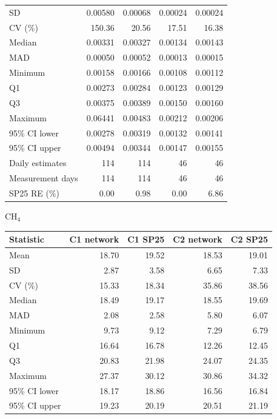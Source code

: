\begin{table}
\begin{minipage}[t]{0.48\textwidth}
\begin{tabular}{lrrrr}
SD & 0.00580 & 0.00068 & 0.00024 & 0.00024
\\
CV (\%) & 150.36 & 20.56 & 17.51 & 16.38
\\
Median & 0.00331 & 0.00327 & 0.00134 & 0.00143
\\
MAD & 0.00050 & 0.00052 & 0.00013 & 0.00015
\\
Minimum & 0.00158 & 0.00166 & 0.00108 & 0.00112
\\
Q1 & 0.00273 & 0.00284 & 0.00123 & 0.00129
\\
Q3 & 0.00375 & 0.00389 & 0.00150 & 0.00160
\\
Maximum & 0.06441 & 0.00483 & 0.00212 & 0.00206
\\
95\% CI lower & 0.00278 & 0.00319 & 0.00132 & 0.00141
\\
95\% CI upper & 0.00494 & 0.00344 & 0.00147 & 0.00155
\\
Daily estimates & 114 & 114 & 46 & 46
\\
Measurement days & 114 & 114 & 46 & 46
\\
SP25 RE (\%) & 0.00 & 0.98 & 0.00 & 6.86
\\
\bottomrule
\end{tabular}
\end{minipage}
\par\vspace{2mm}
\begin{minipage}[t]{0.48\textwidth}\centering\textbf{$\mathrm{CH_4}$}\par\vspace{1mm}
\begin{tabular}{lrrrr}
\toprule
Statistic & C1 network & C1 SP25 & C2 network & C2 SP25\\
\midrule
Mean & 18.70 & 19.52 & 18.53 & 19.01
\\
SD & 2.87 & 3.58 & 6.65 & 7.33
\\
CV (\%) & 15.33 & 18.34 & 35.86 & 38.56
\\
Median & 18.49 & 19.17 & 18.55 & 19.69
\\
MAD & 2.08 & 2.58 & 5.80 & 6.07
\\
Minimum & 9.73 & 9.12 & 7.29 & 6.79
\\
Q1 & 16.64 & 16.78 & 12.26 & 12.45
\\
Q3 & 20.83 & 21.98 & 24.07 & 24.35
\\
Maximum & 27.37 & 30.12 & 30.86 & 34.32
\\
95\% CI lower & 18.17 & 18.86 & 16.56 & 16.84
\\
95\% CI upper & 19.23 & 20.19 & 20.51 & 21.19
\\

\end{tabular}
\end{minipage}
\end{table}

